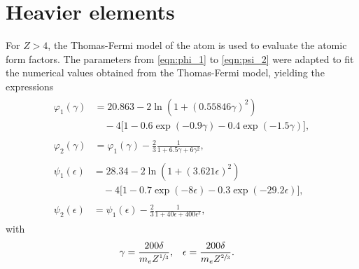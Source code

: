 \section{Heavier elements}

For $Z>4$, the Thomas-Fermi model of the atom is used to evaluate the atomic form factors.
The parameters from \eqref{eqn:phi_1} to \eqref{eqn:psi_2} were adapted to fit the numerical values obtained from the Thomas-Fermi model, yielding the expressions \cite{RevModPhys.46.815}
%
\begingroup
\allowdisplaybreaks
\begin{align}
	\begin{split}
		\varphi_1(\gamma) &= 20.863 - 2 \ln(1 + (0.55846 \gamma)^2) \\&\quad- 4 \biggl[ 1 - 0.6 \exp(-0.9\gamma) - 0.4 \exp(-1.5 \gamma) \biggr],
	\end{split}
	\\[2ex]
	\begin{split}
		\varphi_2(\gamma) &= \varphi_1(\gamma) - \frac{2}{3} \frac{1}{1 + 6.5\gamma + 6\gamma^2},
	\end{split}
	\\[2ex]
	\begin{split}
		\psi_1(\epsilon) &=  28.34 - 2\ln(1 + (3.621 \epsilon)^2) \\&\quad- 4 \biggl[ 1 - 0.7 \exp(- 8 \epsilon) - 0.3 \exp(-29.2\epsilon) \biggr],
	\end{split}
	\\[2ex]
	\begin{split}
		\psi_2(\epsilon) &= \psi_1(\epsilon) - \frac{2}{3} \frac{1}{1 + 40\epsilon + 400\epsilon^2},
	\end{split}
\end{align}
\endgroup
%
with
%
\begin{align*}
	\gamma &= \frac{200 \delta}{m_e Z^{\sfrac{1}{3}}}, & \epsilon &= \frac{200 \delta}{m_e Z^{\sfrac{2}{3}}}.
\end{align*}
%